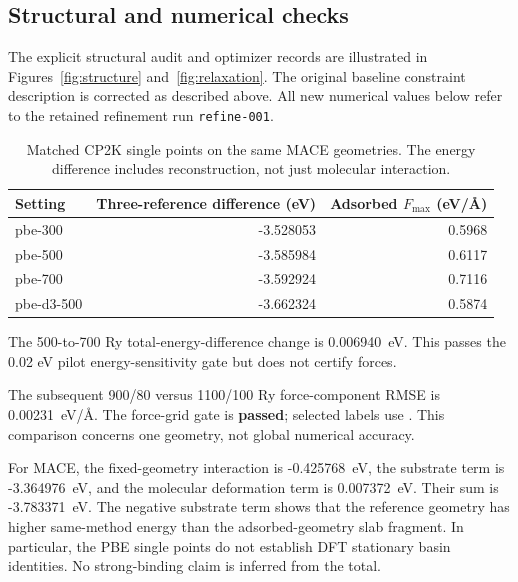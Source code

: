\subsection{Structural and numerical checks}

The explicit structural audit and optimizer records are illustrated in Figures~\ref{fig:structure} and~\ref{fig:relaxation}. The original baseline constraint description is corrected as described above. All new numerical values below refer to the retained refinement run \texttt{refine-001}.

\begin{table}[ht]\centering\small

\caption{Matched CP2K single points on the same MACE geometries. The energy difference includes reconstruction, not just molecular interaction.}

\begin{tabular}{lrr}\toprule Setting & Three-reference difference (eV) & Adsorbed $F_{\max}$ (eV/\AA)\\\midrule

pbe-300 & -3.528053 & 0.5968 \\

pbe-500 & -3.585984 & 0.6117 \\

pbe-700 & -3.592924 & 0.7116 \\

pbe-d3-500 & -3.662324 & 0.5874 \\

\bottomrule\end{tabular}\end{table}

The 500-to-700 Ry total-energy-difference change is 0.006940~eV. This passes the 0.02 eV pilot energy-sensitivity gate but does not certify forces.

The subsequent 900/80 versus 1100/100 Ry force-component RMSE is 0.00231~eV/\AA. The force-grid gate is \textbf{passed}; selected labels use \LabelSettings. This comparison concerns one geometry, not global numerical accuracy.

For MACE, the fixed-geometry interaction is -0.425768~eV, the substrate term is -3.364976~eV, and the molecular deformation term is 0.007372~eV. Their sum is -3.783371~eV. The negative substrate term shows that the reference geometry has higher same-method energy than the adsorbed-geometry slab fragment. In particular, the PBE single points do not establish DFT stationary basin identities. No strong-binding claim is inferred from the total.

